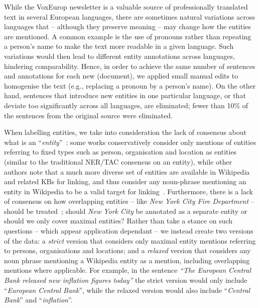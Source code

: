 \documentclass{llncs}
\begin{document}
While the VoxEurop newsletter is a valuable source of professionally translated text in several European languages, there are sometimes natural variations across languages that -- although they preserve meaning -- may change how the entities are mentioned. A common example is the use of pronouns rather than repeating a person's name to make the text more readable in a given language. Such variations would then lead to different entity annotations across languages, hindering comparability. Hence, in order to achieve the same number of sentences and annotations for each new (document), we applied small manual edits to homogenise the text (e.g., replacing a pronoun by a person's name). On the other hand, sentences that introduce new entities in one particular language, or that deviate too significantly across all languages, are eliminated; fewer than 10\% of the sentences from the original source were eliminated.

When labelling entities, we take into consideration the lack of consensus about what is an ``\textit{entity}''~\cite{usa_Gerbil_jha2017all,LingSW15,ourAMW2018}: some works conservatively consider only mentions of entities referring to fixed types such as person, organisation and location as entities (similar to the traditional NER/TAC consensus on an entity), while other authors note that a much more diverse set of entities are available in Wikipedia and related KBs for linking, and thus consider any noun-phrase mentioning an entity in Wikipedia to be a valid target for linking~\cite{PereraMAST16}. Furthermore, there is a lack of consensus on how overlapping entities -- like \textit{New York City Fire Department} -- should be treated~\cite{usa_Gerbil_jha2017all,LingSW15}; should \textit{New York City} be annotated as a separate entity or should we only cover maximal entities? Rather than take a stance on such questions -- which appear application dependant -- we instead create two versions of the data: a \textit{strict} version that considers only maximal entity mentions referring to persons, organisations and locations; and a \textit{relaxed} version that considers any noun phrase mentioning a Wikipedia entity as a mention, including overlapping mentions where applicable. For example, in the sentence \textit{``The European Central Bank released new inflation figures today''} the strict version would only include ``\textit{European Central Bank}'', while the relaxed version would also include ``\textit{Central Bank}'' and ``\textit{inflation}''.
\end{document}
